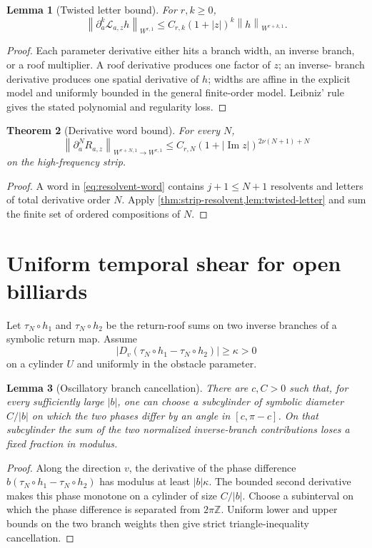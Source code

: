 \documentclass[11pt,reqno]{amsart}
\newtheorem{theorem}{Theorem}[section]
\newtheorem{lemma}[theorem]{Lemma}
\theoremstyle{definition}
\theoremstyle{remark}
\newcommand{\norm}[1]{\left\lVert#1\right\rVert}
\newcommand{\abs}[1]{\left\lvert#1\right\rvert}
\begin{document}
\begin{lemma}[Twisted letter bound]\label{lem:twisted-letter}
For $r,k\ge0$,
\[
 \norm{\partial_a^k\mathcal L_{a,z}h}_{W^{r,1}}
 \le C_{r,k}(1+\abs z)^k\norm h_{W^{r+k,1}}.
\]
\end{lemma}

\begin{proof}
Each parameter derivative either hits a branch width, an inverse branch, or a
roof multiplier.  A roof derivative produces one factor of $z$; an inverse-
branch derivative produces one spatial derivative of $h$; widths are affine in
the explicit model and uniformly bounded in the general finite-order model.
Leibniz' rule gives the stated polynomial and regularity loss.
\end{proof}

\begin{theorem}[Derivative word bound]\label{thm:derivative-word}
For every $N$,
\[
 \norm{\partial_a^NR_{a,z}}_{W^{r+N,1}\to W^{r,1}}
 \le C_{r,N}(1+\abs{\operatorname{Im}z})^{2\nu(N+1)+N}
\]
on the high-frequency strip.
\end{theorem}

\begin{proof}
A word in \eqref{eq:resolvent-word} contains $j+1\le N+1$ resolvents and
letters of total derivative order $N$.  Apply
\cref{thm:strip-resolvent,lem:twisted-letter} and sum the finite set of ordered
compositions of $N$.
\end{proof}

\section{Uniform temporal shear for open billiards}

Let $\tau_N\circ h_1$ and $\tau_N\circ h_2$ be the return-roof sums on two
inverse branches of a symbolic return map.  Assume
\[
 \abs{D_v(\tau_N\circ h_1-\tau_N\circ h_2)}\ge\kappa>0
\]
on a cylinder $U$ and uniformly in the obstacle parameter.

\begin{lemma}[Oscillatory branch cancellation]\label{lem:oscillatory}
There are $c,C>0$ such that, for every sufficiently large $\abs b$, one can
choose a subcylinder of symbolic diameter $C/\abs b$ on which the two phases
differ by an angle in $[c,\pi-c]$.  On that subcylinder the sum of the two
normalized inverse-branch contributions loses a fixed fraction in modulus.
\end{lemma}

\begin{proof}
Along the direction $v$, the derivative of the phase difference
$b(\tau_N\circ h_1-\tau_N\circ h_2)$ has modulus at least $\abs b\kappa$.
The bounded second derivative makes this phase monotone on a cylinder of size
$C/\abs b$.  Choose a subinterval on which the phase difference is separated
from $2\pi\mathbb Z$.  Uniform lower and upper bounds on the two branch weights
then give strict triangle-inequality cancellation.
\end{proof}
\end{document}

